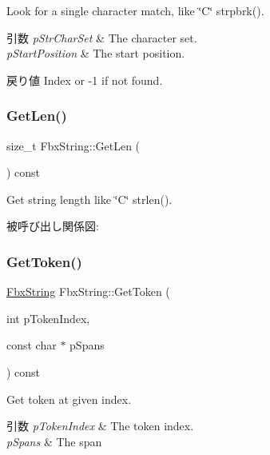 Look for a single character match, like \char`\"{}\+C\char`\"{} strpbrk(). 
\begin{DoxyParams}{引数}
{\em p\+Str\+Char\+Set} & The character set. \\
\hline
{\em p\+Start\+Position} & The start position. \\
\hline
\end{DoxyParams}
\begin{DoxyReturn}{戻り値}
Index or -\/1 if not found. 
\end{DoxyReturn}
\mbox{\label{class_fbx_string_aeeead7b16201dd92aa3353c131f40c28}} 
\subsubsection{\texorpdfstring{Get\+Len()}{GetLen()}}
{\footnotesize\ttfamily size\+\_\+t Fbx\+String\+::\+Get\+Len (\begin{DoxyParamCaption}{ }\end{DoxyParamCaption}) const}



Get string length like \char`\"{}\+C\char`\"{} strlen(). 

被呼び出し関係図\+:
\mbox{\label{class_fbx_string_a1836040bac11746d73e7c665216e0292}} 
\subsubsection{\texorpdfstring{Get\+Token()}{GetToken()}}
{\footnotesize\ttfamily \hyperlink{class_fbx_string}{Fbx\+String} Fbx\+String\+::\+Get\+Token (\begin{DoxyParamCaption}\item[{int}]{p\+Token\+Index,  }\item[{const char $\ast$}]{p\+Spans }\end{DoxyParamCaption}) const}

Get token at given index. 
\begin{DoxyParams}{引数}
{\em p\+Token\+Index} & The token index. \\
\hline
{\em p\+Spans} & The span \\
\hline
\end{DoxyParams}
\mbox{\label{class_fbx_string_a6ac1ce41710e19cf01a3db4f82fecbe0}} 
